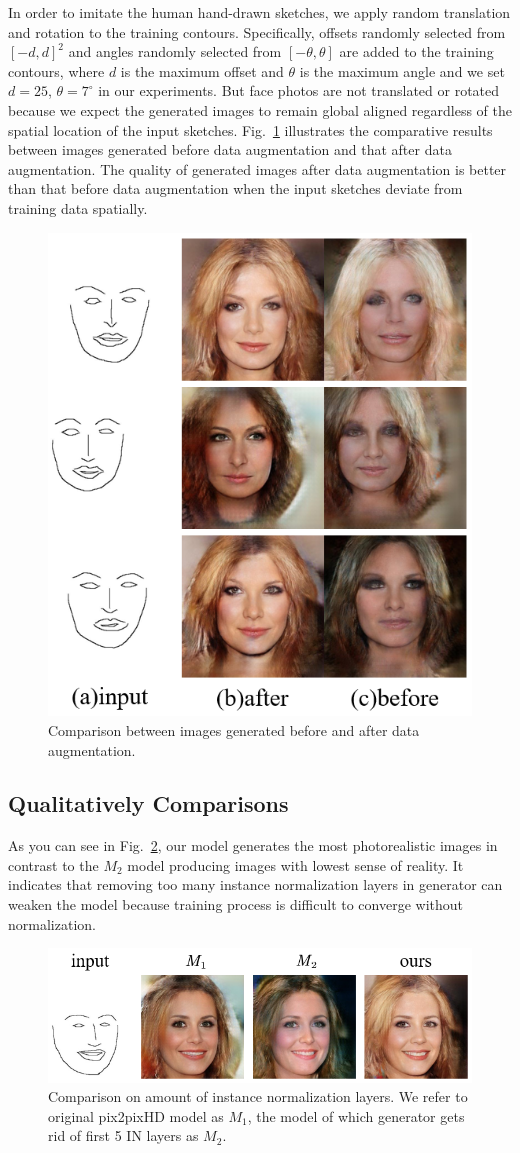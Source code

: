 \documentclass[10pt,twocolumn,letterpaper]{article}
\begin{document}
In order to imitate the human hand-drawn sketches, we apply random translation and rotation to the training contours. 
Specifically, offsets randomly selected from $[-d,d]^2$ and angles randomly selected from $[-\theta,\theta]$ are added to the training contours, where $d$ is the maximum offset and $\theta$ is the maximum angle and we set $d=25$, $\theta=7^\circ$ in our experiments. 
But face photos are not translated or rotated because we expect the generated images to remain global aligned regardless of the spatial location of the input sketches.
Fig.~\ref{fig:data_augmentation} illustrates the comparative results between images generated before data augmentation and that after data augmentation. 
The quality of generated images after data augmentation is better than that before data augmentation when the input sketches deviate from training data spatially.

\begin{figure}[htb]
	\centering
	\includegraphics[width=0.35 \textwidth]{data_augmentation.png}
	\caption{Comparison between images generated before and after data augmentation. }
	\label{fig:data_augmentation}
\end{figure}


\subsection{Qualitatively Comparisons}\label{sec:results}
As you can see in Fig.~\ref{fig:ablation}, our model generates the most photorealistic images in contrast to the $M_2$ model producing images with lowest sense of reality. It indicates that removing too many instance normalization layers in generator can weaken the model because training process is difficult to converge without normalization.
\begin{figure}[htb]
	\centering
	\includegraphics[width=\columnwidth ]{ablation.png}
	\caption{Comparison on amount of instance normalization layers. We refer to original pix2pixHD model as $M_1$, the model of which generator gets rid of first 5 IN layers as $M_2$.}
	\label{fig:ablation}
\end{figure}  
\end{document}
